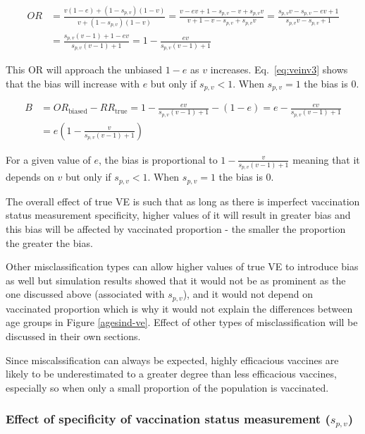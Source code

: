 \documentclass[11pt]{article}
\begin{document}
\begin{equation} \label{eq:veinv2}
\begin{aligned}
OR &= \frac{v(1-e)+(1-s_{p,v})(1-v)}{v+(1-s_{p,v})(1-v)} =  \frac{v-ev+1-s_{p,v}-v+s_{p,v}v}{v+1-v-s_{p,v}+s_{p,v}v} =  
	\frac{s_{p,v}v-s_{p,v}-ev+1}{s_{p,v}v-s_{p,v}+1} \\
	&= \frac{s_{p,v}(v-1)+1-ev}{s_{p,v}(v-1)+1} = 1 - \frac{ev}{s_{p,v}(v-1)+1}
\end{aligned}
\end{equation}

This OR will approach the unbiased $1-e$ as $v$ increases. Eq.\ \ref{eq:veinv3} shows that the bias will increase with $e$ but only if $s_{p,v}<1$. When $s_{p,v}=1$ the bias is 0.

\begin{equation} \label{eq:veinv3}
\begin{aligned}
B &= OR_{\text{biased}} - RR_{\text{true}} = 1 - \frac{ev}{s_{p,v}(v-1)+1} - (1-e) = e - \frac{ev}{s_{p,v}(v-1)+1} \\
	&= e(1 - \frac{v}{s_{p,v}(v-1)+1})
\end{aligned}
\end{equation}

For a given value of $e$, the bias is proportional to $1 - \frac{v}{s_{p,v}(v-1)+1}$ meaning that it depends on $v$ but only if $s_{p,v}<1$. When $s_{p,v}=1$ the bias is 0.

The overall effect of true VE is such that as long as there is imperfect vaccination status measurement specificity, higher values of it will result in greater bias and this bias will be affected by vaccinated proportion - the smaller the proportion the greater the bias. 

Other misclassification types can allow higher values of true VE to introduce bias as well but simulation results showed that it would not be as prominent as the one discussed above (associated with $s_{p,v}$), and it would not depend on vaccinated proportion which is why it would not explain the differences between age groups in Figure \ref{agesind-ve}. Effect of other types of misclassification will be discussed in their own sections.

Since miscalssification can always be expected, highly efficacious vaccines are likely to be underestimated to a greater degree than less efficacious vaccines, especially so when only a small proportion of the population is vaccinated.

\subsubsection{Effect of specificity of vaccination status measurement ($s_{p,v}$)}
\end{document}

